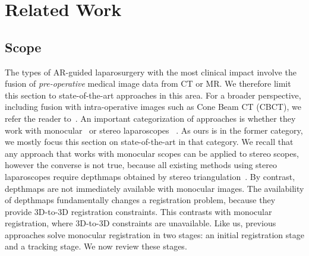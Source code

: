 
\section{Related Work}
\label{sec:sota}
\subsection{Scope}
The types of AR-guided laparosurgery with the most clinical impact involve the fusion of \emph{pre-operative} medical image data from CT or MR. We therefore limit this section to state-of-the-art approaches in this area.
For a broader perspective, including fusion with intra-operative images such as Cone Beam CT (CBCT), we refer the reader to~\cite{Bernhardt2017}.
An important categorization of approaches is whether they work with monocular~\cite{affineTracking} or stereo laparoscopes ~\cite{21142942,conf/miccai/Amir-KhaliliNPHA13,Cohen2010Prostate,hamarneh2014igrs,haouchine13,Su2009, MaierHein2013}.
As ours is in the former category, we mostly focus this section on state-of-the-art in that category.
We recall that any approach that works with monocular scopes can be applied to stereo scopes, however the converse is not true, because all existing
methods using stereo laparoscopes require depthmaps obtained by stereo triangulation~\cite{DBLP:conf/miccai/StoyanovSPY10}.
By contrast, depthmaps are not immediately available with monocular images. %
The availability of depthmaps fundamentally changes a registration problem, because they provide 3D-to-3D registration constraints.
This contrasts with monocular registration, where 3D-to-3D constraints are unavailable.
Like us, previous approaches solve monocular registration in two stages: an initial registration stage and a tracking stage.
We now review these stages.

